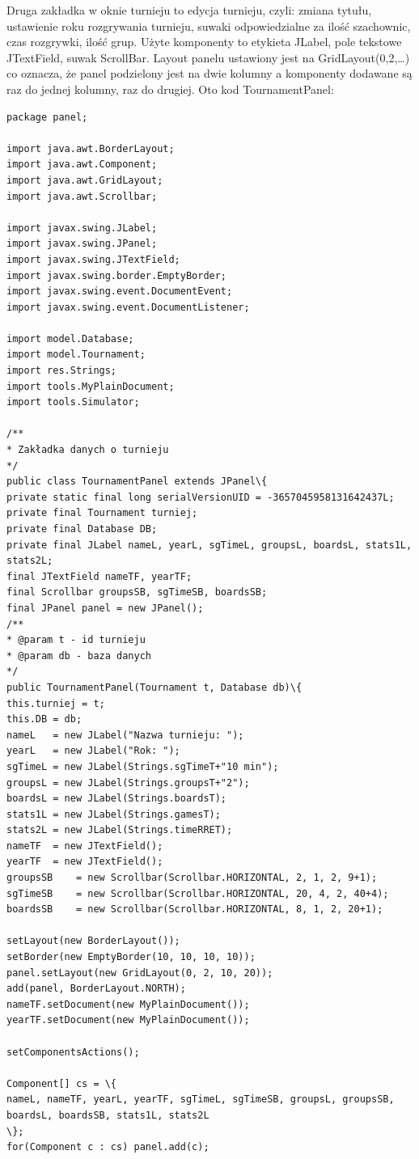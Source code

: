 Druga zakładka w oknie turnieju to edycja turnieju, czyli: zmiana tytułu, ustawienie roku rozgrywania turnieju, suwaki odpowiedzialne za ilość szachownic, czas rozgrywki, ilość grup. Użyte komponenty to etykieta JLabel, pole tekstowe JTextField, suwak ScrollBar. Layout panelu ustawiony jest na GridLayout(0,2,…) co oznacza, że panel podzielony jest na dwie kolumny a komponenty dodawane są raz do jednej kolumny, raz do drugiej. Oto kod TournamentPanel:
\begin{verbatim}
package panel;

import java.awt.BorderLayout;
import java.awt.Component;
import java.awt.GridLayout;
import java.awt.Scrollbar;

import javax.swing.JLabel;
import javax.swing.JPanel;
import javax.swing.JTextField;
import javax.swing.border.EmptyBorder;
import javax.swing.event.DocumentEvent;
import javax.swing.event.DocumentListener;

import model.Database;
import model.Tournament;
import res.Strings;
import tools.MyPlainDocument;
import tools.Simulator;

/**
* Zakładka danych o turnieju
*/
public class TournamentPanel extends JPanel\{
private static final long serialVersionUID = -3657045958131642437L;
private final Tournament turniej;
private final Database DB;
private final JLabel nameL, yearL, sgTimeL, groupsL, boardsL, stats1L, stats2L;
final JTextField nameTF, yearTF;
final Scrollbar groupsSB, sgTimeSB, boardsSB;
final JPanel panel = new JPanel();
/**
* @param t - id turnieju
* @param db - baza danych
*/
public TournamentPanel(Tournament t, Database db)\{
this.turniej = t;
this.DB = db;
nameL 	= new JLabel("Nazwa turnieju: ");
yearL 	= new JLabel("Rok: ");
sgTimeL = new JLabel(Strings.sgTimeT+"10 min");
groupsL = new JLabel(Strings.groupsT+"2");
boardsL = new JLabel(Strings.boardsT);
stats1L = new JLabel(Strings.gamesT);
stats2L = new JLabel(Strings.timeRRET);
nameTF 	= new JTextField();
yearTF  = new JTextField();
groupsSB 	= new Scrollbar(Scrollbar.HORIZONTAL, 2, 1, 2, 9+1);
sgTimeSB 	= new Scrollbar(Scrollbar.HORIZONTAL, 20, 4, 2, 40+4);
boardsSB 	= new Scrollbar(Scrollbar.HORIZONTAL, 8, 1, 2, 20+1);

setLayout(new BorderLayout());
setBorder(new EmptyBorder(10, 10, 10, 10));
panel.setLayout(new GridLayout(0, 2, 10, 20));
add(panel, BorderLayout.NORTH);
nameTF.setDocument(new MyPlainDocument());
yearTF.setDocument(new MyPlainDocument());

setComponentsActions();

Component[] cs = \{
nameL, nameTF, yearL, yearTF, sgTimeL, sgTimeSB, groupsL, groupsSB, boardsL, boardsSB, stats1L, stats2L
\};
for(Component c : cs) panel.add(c);


\end{verbatim}
